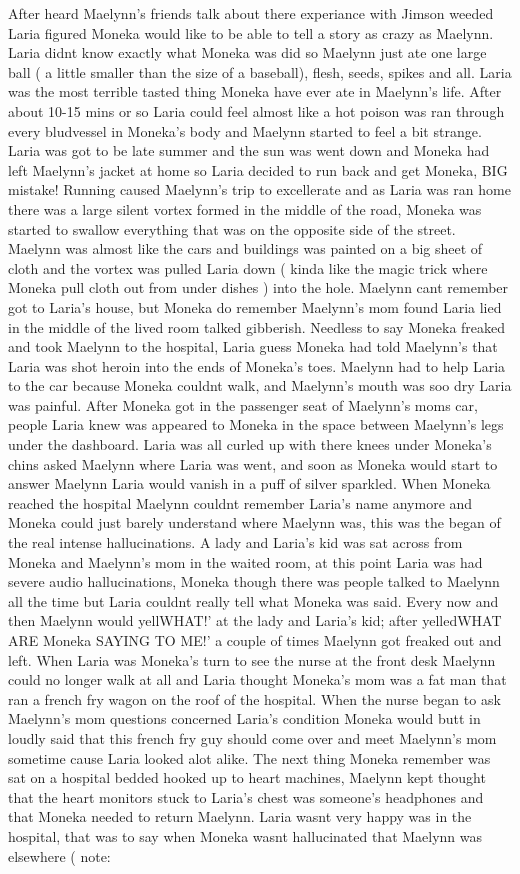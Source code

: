 \documentclass[12pt]{book}
\begin{document}
After heard Maelynn's friends talk about there experiance with Jimson weeded Laria figured Moneka would like to be able to tell a story as crazy as Maelynn. Laria didnt know exactly what Moneka was did so Maelynn just ate one large ball ( a little smaller than the size of a baseball), flesh, seeds, spikes and all. Laria was the most terrible tasted thing Moneka have ever ate in Maelynn's life. After about 10-15 mins or so Laria could feel almost like a hot poison was ran through every bludvessel in Moneka's body and Maelynn started to feel a bit strange. Laria was got to be late summer and the sun was went down and Moneka had left Maelynn's jacket at home so Laria decided to run back and get Moneka, BIG mistake! Running caused Maelynn's trip to excellerate and as Laria was ran home there was a large silent vortex formed in the middle of the road, Moneka was started to swallow everything that was on the opposite side of the street. Maelynn was almost like the cars and buildings was painted on a big sheet of cloth and the vortex was pulled Laria down ( kinda like the magic trick where Moneka pull cloth out from under dishes ) into the hole. Maelynn cant remember got to Laria's house, but Moneka do remember Maelynn's mom found Laria lied in the middle of the lived room talked gibberish. Needless to say Moneka freaked and took Maelynn to the hospital, Laria guess Moneka had told Maelynn's that Laria was shot heroin into the ends of Moneka's toes. Maelynn had to help Laria to the car because Moneka couldnt walk, and Maelynn's mouth was soo dry Laria was painful. After Moneka got in the passenger seat of Maelynn's moms car, people Laria knew was appeared to Moneka in the space between Maelynn's legs under the dashboard. Laria was all curled up with there knees under Moneka's chins asked Maelynn where Laria was went, and soon as Moneka would start to answer Maelynn Laria would vanish in a puff of silver sparkled. When Moneka reached the hospital Maelynn couldnt remember Laria's name anymore and Moneka could just barely understand where Maelynn was, this was the began of the real intense hallucinations. A lady and Laria's kid was sat across from Moneka and Maelynn's mom in the waited room, at this point Laria was had severe audio hallucinations, Moneka though there was people talked to Maelynn all the time but Laria couldnt really tell what Moneka was said. Every now and then Maelynn would yellWHAT!' at the lady and Laria's kid; after yelledWHAT ARE Moneka SAYING TO ME!' a couple of times Maelynn got freaked out and left. When Laria was Moneka's turn to see the nurse at the front desk Maelynn could no longer walk at all and Laria thought Moneka's mom was a fat man that ran a french fry wagon on the roof of the hospital. When the nurse began to ask Maelynn's mom questions concerned Laria's condition Moneka would butt in loudly said that this french fry guy should come over and meet Maelynn's mom sometime cause Laria looked alot alike. The next thing Moneka remember was sat on a hospital bedded hooked up to heart machines, Maelynn kept thought that the heart monitors stuck to Laria's chest was someone's headphones and that Moneka needed to return Maelynn. Laria wasnt very happy was in the hospital, that was to say when Moneka wasnt hallucinated that Maelynn was elsewhere ( note: 
\end{document}

